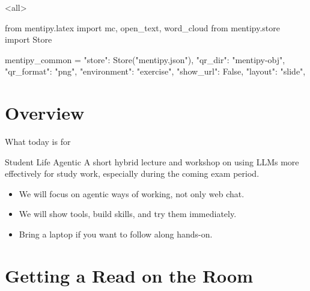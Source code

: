 \mode<all>
\begin{pycode}
from mentipy.latex import mc, open_text, word_cloud
from mentipy.store import Store


mentipy_common = {
    "store": Store("mentipy.json"),
    "qr_dir": "mentipy-obj",
    "qr_format": "png",
    "environment": "exercise",
    "show_url": False,
    "layout": "slide",
}
\end{pycode}

\mode*

\begin{frame}
  \maketitle
\end{frame}

\begin{abstract}
  
\end{abstract}

\begin{frame}
\end{frame}


\section{Overview}

\begin{frame}{What today is for}
  \begin{block}{Student Life Agentic}
    A short hybrid lecture and workshop on using LLMs more effectively for
    study work, especially during the coming exam period.
  \end{block}

  \begin{itemize}
    \item We will focus on agentic ways of working, not only web chat.
    \item We will show tools, build skills, and try them immediately.
    \item Bring a laptop if you want to follow along hands-on.
  \end{itemize}
\end{frame}


\section{Getting a Read on the Room}

